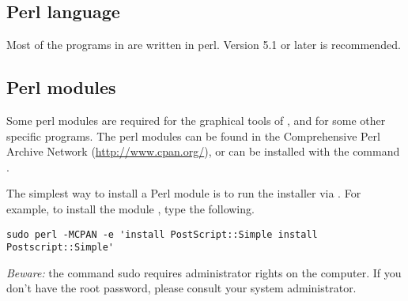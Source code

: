 \documentclass[12pt,a4paper, oneside]{scrreprt} %
\begin{document}
\subsection{Perl language}

Most of the programs in \RSAT are written in perl. Version 5.1 or
later is recommended.

\subsection{Perl modules}

Some perl modules are required for the graphical tools of \RSAT, and
for some other specific programs. The perl modules can be found in the
Comprehensive Perl Archive Network (\url{http://www.cpan.org/}), or
can be installed with the command .


The simplest way to install a Perl module is to run the 
installer via . For example, to install the module
, type the following.

\begin{lstlisting}
sudo perl -MCPAN -e 'install PostScript::Simple install Postscript::Simple' 
\end{lstlisting}

\emph{Beware:} the command sudo requires administrator rights on the
computer. If you don't have the root password, please consult your
system administrator.
\end{document}

